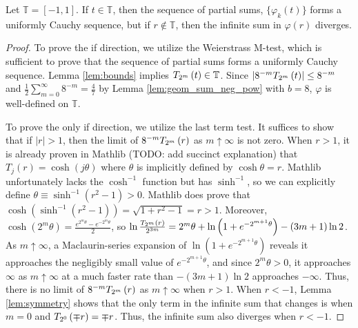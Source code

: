 \begin{lemma}
  \label{lem:convergence_characterization}
  Let $\mathbb{T} = \left[-1,1\right]$. If $t \in \mathbb{T}$, then the sequence of partial sums, $\{\varphi_k\left(t\right)\}$ forms a uniformly Cauchy sequence, but if $r \notin \mathbb{T}$, then the infinite sum in $\varphi\left(r\right)$ diverges.
\end{lemma}
\begin{proof}
  \leanok
  To prove the if direction, we utilize the Weierstrass M-test, which is sufficient to prove that the sequence of partial sums forms a uniformly Cauchy sequence. Lemma \ref{lem:bounds} implies $\TT[t]{m} \in \mathbb{T}$. Since $\left|8^{-m} \TT[t]{m}\right| \leq 8^{-m}$ and $\frac{1}{2}\sum\limits_{m = 0}^\infty 8^{-m} = \frac{4}{7}$ by Lemma \ref{lem:geom_sum_neg_pow} with $b = 8$, $\varphi$ is well-defined on $\mathbb{T}$.

  To prove the only if direction, we utilize the last term test. It suffices to show that if $\left|r\right| > 1$, then the limit of $8^{-m} \TT[r]{m}$ as $m \uparrow \infty$ is not zero. When $r > 1$, it is already proven in Mathlib (TODO: add succinct explanation) that $T_j\left(r\right) = \cosh\left(j \theta\right)$ where $\theta$ is implicitly defined by $\cosh \theta = r$. Mathlib unfortunately lacks the $\cosh^{-1}$ function but has $\sinh^{-1}$, so we can explicitly define $\theta \equiv \sinh^{-1}\left(r^2 - 1\right) > 0$. Mathlib does prove that $\cosh\left(\sinh^{-1}\left(r^2 - 1\right)\right) = \sqrt{1 + r^2 - 1} = r > 1$. Moreover, $\cosh\left(2^m \theta\right) = \frac{e^{2^m \theta} - e^{-2^m \theta}}{2}$, so $\ln \frac{\TT[r]{m}}{2^{3m}} = 2^m \theta + \ln\left(1 + e^{-2^{m + 1} \theta}\right) - \left(3m + 1\right) \ln 2$. As $m \uparrow \infty$, a Maclaurin-series expansion of $\ln\left(1 + e^{-2^{m + 1} \theta}\right)$ reveals it approaches the negligibly small value of $e^{-2^{m + 1} \theta}$, and since $2^m \theta > 0$, it approaches $\infty$ as $m \uparrow \infty$ at a much faster rate than $-\left(3m + 1\right) \ln 2$ approaches $-\infty$. Thus, there is no limit of $8^{-m} \TT[r]{m}$ as $m \uparrow \infty$ when $r > 1$. When $r < -1$, Lemma \ref{lem:symmetry} shows that the only term in the infinite sum that changes is when $m = 0$ and $\TT[\mp r]{0} = \mp r$. Thus, the infinite sum also diverges when $r < -1$.
\end{proof}

